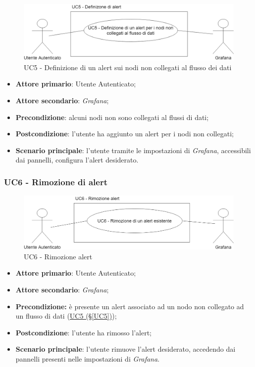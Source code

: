 \begin{figure}[H]
	\centering
	\includegraphics[scale=0.4]{./images/UC5.png}
	\caption{UC5 - Definizione di un alert sui nodi non collegati al flusso dei dati}
\end{figure}

\begin{itemize}
	\item \textbf{Attore primario}: Utente Autenticato;
	\item \textbf{Attore secondario}: \textit{Grafana};
	\item \textbf{Precondizione}: alcuni nodi non sono collegati al flussi di dati;
	\item \textbf{Postcondizione}: l'utente ha aggiunto un alert per i nodi non collegati;
	\item \textbf{Scenario principale}: l'utente tramite le impostazioni di \textit{Grafana}, accessibili dai pannelli, configura l'alert desiderato.
\end{itemize}

\newpage

\subsubsection{UC6 - Rimozione di alert}\label{UC6}

\begin{figure}[H]
	\centering
	\includegraphics[scale=0.4]{./images/UC6.png}
	\caption{UC6 - Rimozione alert}
\end{figure}

\begin{itemize}
	\item \textbf{Attore primario}: Utente Autenticato;
	\item \textbf{Attore secondario}: \textit{Grafana};
	\item \textbf{Precondizione:} è presente un alert associato ad un nodo non collegato ad un flusso di dati
	(\hyperref[UC5]{UC5 (§\ref*{UC5})});
	\item \textbf{Postcondizione}: l'utente ha rimosso l'alert;
	\item \textbf{Scenario principale}: l'utente rimuove l'alert desiderato, accedendo dai pannelli presenti nelle impostazioni di \textit{Grafana}.
\end{itemize}

